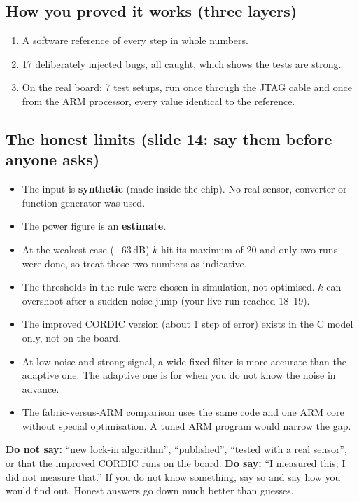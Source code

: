 \documentclass[11pt,a4paper]{article}
\begin{document}
\subsection*{How you proved it works (three layers)}
\begin{enumerate}
\item A software reference of every step in whole numbers.
\item 17 deliberately injected bugs, all caught, which shows the tests are strong.
\item On the real board: 7 test setups, run once through the JTAG cable and once from the ARM processor, every value identical to the reference.
\end{enumerate}

\subsection*{The honest limits (slide 14: say them before anyone asks)}
\begin{itemize}
\item The input is \textbf{synthetic} (made inside the chip). No real sensor, converter or function generator was used.
\item The power figure is an \textbf{estimate}.
\item At the weakest case ($-63$\,dB) $k$ hit its maximum of 20 and only two runs were done, so treat those two numbers as indicative.
\item The thresholds in the rule were chosen in simulation, not optimised. $k$ can overshoot after a sudden noise jump (your live run reached 18--19).
\item The improved CORDIC version (about 1 step of error) exists in the C model only, not on the board.
\item At low noise and strong signal, a wide fixed filter is more accurate than the adaptive one. The adaptive one is for when you do not know the noise in advance.
\item The fabric-versus-ARM comparison uses the same code and one ARM core without special optimisation. A tuned ARM program would narrow the gap.
\end{itemize}

\begin{careful}
\textbf{Do not say:} ``new lock-in algorithm'', ``published'', ``tested with a real sensor'', or that the improved CORDIC runs on the board. \textbf{Do say:} ``I measured this; I did not measure that.'' If you do not know something, say so and say how you would find out. Honest answers go down much better than guesses.
\end{careful}
\end{document}
